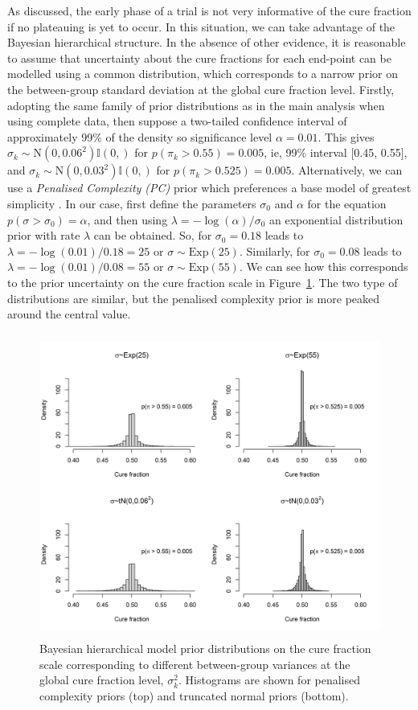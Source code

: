 \documentclass[AMA,STIX1COL]{WileyNJD-v2}
\begin{document}
As discussed, the early phase of a trial is not very informative of the cure fraction if no plateauing is yet to occur. In this situation, we can take advantage of the Bayesian hierarchical structure. In the absence of other evidence, it is reasonable to assume that uncertainty about the cure fractions for each end-point can be modelled using a common distribution, which corresponds to a narrow prior on the between-group standard deviation at the global cure fraction level. 
Firstly, adopting the same family of prior distributions as in the main analysis when using complete data, then suppose a two-tailed confidence interval of approximately 99\% of the density so significance level $\alpha = 0.01$.
This gives $\sigma_k \sim \mbox{N}(0, 0.06^2)\mathbb{I}(0,)$ for $p(\pi_k > 0.55) = 0.005$, ie, 99\% interval [0.45, 0.55], and $\sigma_k \sim \mbox{N}(0, 0.03^2)\mathbb{I}(0,)$ for $p(\pi_k > 0.525) = 0.005$.
Alternatively, we can use a {\it Penalised Complexity (PC)} prior which preferences a base model of greatest simplicity \cite{Simpson2017}.
In our case, first define the parameters $\sigma_0$ and $\alpha$ for the equation $p(\sigma > \sigma_0) = \alpha$, and then using $\lambda = - \log(\alpha)/\sigma_0$ an exponential distribution prior with rate $\lambda$ can be obtained.
So, for $\sigma_0 = 0.18$ leads to $\lambda = - \log(0.01)/0.18 = 25$ or $\sigma \sim \mbox{Exp}(25)$.
Similarly, for $\sigma_0 = 0.08$ leads to $\lambda = - \log(0.01)/0.08 = 55$ or $\sigma \sim \mbox{Exp}(55)$.
We can see how this corresponds to the prior uncertainty on the cure fraction scale in Figure~\ref{fig:complexityprior}. The two type of distributions are similar, but the penalised complexity prior is more peaked around the central value.

\begin{figure}[!ht]
\centering
\includegraphics[height=10cm, width=0.6\linewidth]{complexity-prior-plot.png}
\caption{\label{fig:complexityprior} Bayesian hierarchical model prior distributions on the cure fraction scale corresponding to different between-group variances at the global cure fraction level, $\sigma_k^2$. Histograms are shown for penalised complexity priors (top) and truncated normal priors (bottom).}
\end{figure}
\end{document}
